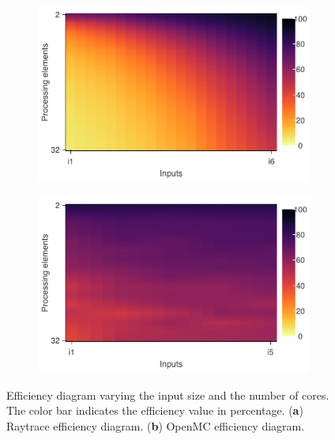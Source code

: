 \begin{figure}[H]
	\begin{subfigure}[b]{0.46\textwidth}
		\includegraphics[width=\textwidth]{pascalanalyzer/figures/results/efficiency_raytrace.png}
		\caption{\centering}
		\label{fig:efficiency_raytrace}
	\end{subfigure}
	\begin{subfigure}[b]{0.46\textwidth}
		\includegraphics[width=\textwidth]{pascalanalyzer/figures/results/efficiency_openmc.png}
		\caption{\centering}
		\label{fig:efficiency_openmc}
	\end{subfigure}
	
	\caption{Efficiency diagram varying the input size and the number of cores. The color bar indicates the efficiency value in percentage. (\textbf{a}) Raytrace efficiency diagram. (\textbf{b}) OpenMC efficiency diagram.}
	\label{fig:efficiency_all}
\end{figure}


